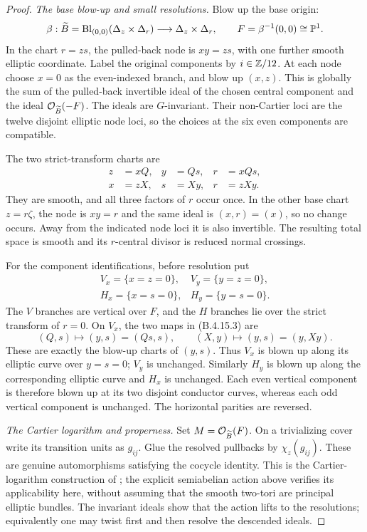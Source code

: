 \begin{proof}
\emph{The base blow-up and small resolutions.}
Blow up the base origin:
\[
 \beta:\widetilde B=\operatorname{Bl}_{(0,0)}
            (\Delta_z\times\Delta_r)
       \longrightarrow\Delta_z\times\Delta_r,
 \qquad F=\beta^{-1}(0,0)\cong\mathbb P^1.
\]
In the chart $r=zs$, the pulled-back node is
$xy=zs$, with one further smooth elliptic coordinate.
Label the original components by $i\in\mathbb Z/12$.
At each node choose $x=0$ as the even-indexed branch,
and blow up $(x,z)$. This is globally the sum of the
pulled-back invertible ideal of the chosen central
component and the ideal $\mathcal O_{\widetilde B}(-F)$.
The ideals are $G$-invariant. Their non-Cartier loci are
the twelve disjoint elliptic node loci, so the choices
at the six even components are compatible.

The two strict-transform charts are
\[
 \begin{aligned}
 z&=xQ,&y&=Qs,&r&=xQs,\\
 x&=zX,&s&=Xy,&r&=zXy.
 \end{aligned}
 \tag{B.4.15.3}
\]
They are smooth, and all three factors of $r$ occur once.
In the other base chart $z=r\zeta$, the node is $xy=r$
and the same ideal is $(x,r)=(x)$, so no change occurs.
Away from the indicated node loci it is also invertible.
The resulting total space is smooth and its $r$-central
divisor is reduced normal crossings.

For the component identifications, before resolution put
\[
 \begin{array}{ll}
 V_x=\{x=z=0\},&V_y=\{y=z=0\},\\
 H_x=\{x=s=0\},&H_y=\{y=s=0\}.
 \end{array}
\]
The $V$ branches are vertical over $F$, and the $H$
branches lie over the strict transform of $r=0$.
On $V_x$, the two maps in (B.4.15.3) are
\[
 (Q,s)\longmapsto(y,s)=(Qs,s),\qquad
 (X,y)\longmapsto(y,s)=(y,Xy).
\]
These are exactly the blow-up charts of $(y,s)$.
Thus $V_x$ is blown up along its elliptic curve over
$y=s=0$; $V_y$ is unchanged. Similarly $H_y$ is blown
up along the corresponding elliptic curve and $H_x$
is unchanged. Each even vertical component is therefore
blown up at its two disjoint conductor curves, whereas
each odd vertical component is unchanged. The horizontal
parities are reversed.

\emph{The Cartier logarithm and properness.}
Set $M=\mathcal O_{\widetilde B}(F)$. On a trivializing cover
write its transition units as $g_{ij}$. Glue the resolved
pullbacks by $\chi_z(g_{ij})$. These are genuine
automorphisms satisfying the cocycle identity.
This is the Cartier-logarithm construction of
\citet[Definition~1.1]{Fujimoto1990AB}; the explicit
semiabelian action above verifies its applicability
here, without assuming that the smooth two-tori are
principal elliptic bundles. The invariant ideals show
that the action lifts to the resolutions; equivalently
one may twist first and then resolve the descended ideals.


\end{proof}
